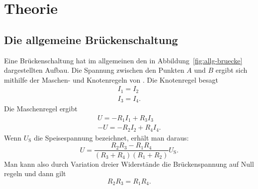 
\section{Theorie}

\subsection{Die allgemeine Brückenschaltung}

Eine Brückenschaltung hat im allgemeinen den in
Abbildung~\ref{fig:allg-bruecke} dargestellten Aufbau.  Die Spannung
zwischen den Punkten $A$ und $B$ ergibt sich mithilfe der Maschen- und
Knotenregeln von . Die Knotenregel besagt
\begin{gather}
  I_1 = I_2\\
  I_3 = I_4.
\end{gather}
Die Maschenregel ergibt
\begin{gather}
  U = -R_1 I_1 + R_3 I_3\\
 -U = -R_2 I_2 + R_4 I_4.
\end{gather}
Wenn $U_\text{S}$ die Speisespannung bezeichnet, erhält man daraus:
\begin{equation}
  U = \frac{R_2 R_3 - R_1 R_4}{(R_3 + R_4)(R_1 + R_2)} U_\text{S}.
\end{equation}
Man kann also durch Variation dreier Widerstände die Brückenspannung auf
Null regeln und dann gilt
\begin{equation}
  R_2 R_3 = R_1 R_4.
\end{equation}

